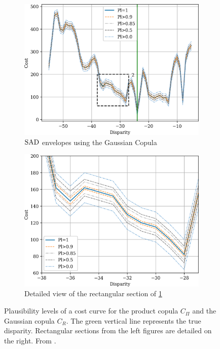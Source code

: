 \begin{figure}
\begin{subfigure}[t]{0.48\linewidth}
    \end{subfigure}
    \begin{subfigure}[t]{0.48\linewidth}
        \centering
        \includegraphics[width=\linewidth]{Images/Chap_4/bel_100_120.png}
        \caption{${\mathrm{SAD}}$ envelopes using the Gaussian Copula}
        \label{fig:belief_gaussian}
    \end{subfigure}\hfill
    \begin{subfigure}[t]{0.48\linewidth}
        \centering
        \includegraphics[width=\linewidth]{Images/Chap_4/bel_100_120_zoom.png}
        \caption{Detailed view of the rectangular section of \ref{fig:belief_gaussian}}
        \label{fig:belief_gaussian_zoom}
    \end{subfigure}
    \caption{Plausibility levels of a cost curve for the product copula $C_\Pi$ and the Gaussian copula $C_R$. The green vertical line represents the true disparity. Rectangular sections from the left figures are detailed on the right. From \cite{malinowski_uncertainty_2024}.}
    \label{fig:belief_curves}
\end{figure}

